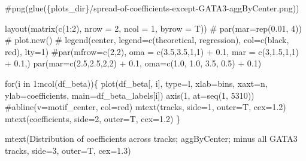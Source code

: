 \documentclass[
  letterpaper,
  DIV=11,
  numbers=noendperiod]{scrartcl}
\newenvironment{Shaded}{\begin{snugshade}}{\end{snugshade}}
\newcommand{\AttributeTok}[1]{\textcolor[rgb]{0.40,0.45,0.13}{#1}}
\newcommand{\CommentTok}[1]{\textcolor[rgb]{0.37,0.37,0.37}{#1}}
\newcommand{\ControlFlowTok}[1]{\textcolor[rgb]{0.00,0.23,0.31}{#1}}
\newcommand{\DecValTok}[1]{\textcolor[rgb]{0.68,0.00,0.00}{#1}}
\newcommand{\FloatTok}[1]{\textcolor[rgb]{0.68,0.00,0.00}{#1}}
\newcommand{\FunctionTok}[1]{\textcolor[rgb]{0.28,0.35,0.67}{#1}}
\newcommand{\NormalTok}[1]{\textcolor[rgb]{0.00,0.23,0.31}{#1}}
\newcommand{\SpecialCharTok}[1]{\textcolor[rgb]{0.37,0.37,0.37}{#1}}
\newcommand{\StringTok}[1]{\textcolor[rgb]{0.13,0.47,0.30}{#1}}
\begin{document}
\begin{Shaded}
\begin{Highlighting}[]
\CommentTok{\#png(glue(\textquotesingle{}\{plots\_dir\}/spread{-}of{-}coefficients{-}except{-}GATA3{-}aggByCenter.png\textquotesingle{}))}

\FunctionTok{layout}\NormalTok{(}\FunctionTok{matrix}\NormalTok{(}\FunctionTok{c}\NormalTok{(}\DecValTok{1}\SpecialCharTok{:}\DecValTok{2}\NormalTok{), }\AttributeTok{nrow =} \DecValTok{2}\NormalTok{, }\AttributeTok{ncol =} \DecValTok{1}\NormalTok{, }\AttributeTok{byrow =}\NormalTok{ T))}
\CommentTok{\# par(mar=rep(0.01, 4))}
\CommentTok{\# plot.new()}
\CommentTok{\# legend(\textquotesingle{}center\textquotesingle{}, legend=c(\textquotesingle{}theoretical\textquotesingle{}, \textquotesingle{}regression\textquotesingle{}), col=c(\textquotesingle{}black\textquotesingle{}, \textquotesingle{}red\textquotesingle{}), lty=1)}
\CommentTok{\#par(mfrow=c(2,2), oma = c(3.5,3.5,1,1) + 0.1, mar = c(3,1.5,1,1) + 0.1,)}
\FunctionTok{par}\NormalTok{(}\AttributeTok{mar=}\FunctionTok{c}\NormalTok{(}\FloatTok{2.5}\NormalTok{,}\FloatTok{2.5}\NormalTok{,}\DecValTok{2}\NormalTok{,}\DecValTok{2}\NormalTok{) }\SpecialCharTok{+} \FloatTok{0.1}\NormalTok{, }\AttributeTok{oma=}\FunctionTok{c}\NormalTok{(}\FloatTok{1.0}\NormalTok{, }\FloatTok{1.0}\NormalTok{, }\FloatTok{3.5}\NormalTok{, }\FloatTok{0.5}\NormalTok{) }\SpecialCharTok{+} \FloatTok{0.1}\NormalTok{)}

\ControlFlowTok{for}\NormalTok{(i }\ControlFlowTok{in} \DecValTok{1}\SpecialCharTok{:}\FunctionTok{ncol}\NormalTok{(df\_beta))\{}
    \FunctionTok{plot}\NormalTok{(df\_beta[, i], }\AttributeTok{type=}\StringTok{\textquotesingle{}l\textquotesingle{}}\NormalTok{, }\AttributeTok{xlab=}\StringTok{\textquotesingle{}bins\textquotesingle{}}\NormalTok{, }\AttributeTok{xaxt=}\StringTok{\textquotesingle{}n\textquotesingle{}}\NormalTok{, }\AttributeTok{ylab=}\StringTok{\textquotesingle{}coefficients\textquotesingle{}}\NormalTok{, }\AttributeTok{main=}\NormalTok{df\_beta\_labels[i])}
    \FunctionTok{axis}\NormalTok{(}\DecValTok{1}\NormalTok{, }\AttributeTok{at=}\FunctionTok{seq}\NormalTok{(}\DecValTok{1}\NormalTok{, }\DecValTok{5310}\NormalTok{))}
    \CommentTok{\#abline(v=motif\_center, col=\textquotesingle{}red\textquotesingle{})}
    \FunctionTok{mtext}\NormalTok{(}\StringTok{\textquotesingle{}tracks\textquotesingle{}}\NormalTok{, }\AttributeTok{side=}\DecValTok{1}\NormalTok{, }\AttributeTok{outer=}\NormalTok{T, }\AttributeTok{cex=}\FloatTok{1.2}\NormalTok{)}
    \FunctionTok{mtext}\NormalTok{(}\StringTok{\textquotesingle{}coefficients\textquotesingle{}}\NormalTok{, }\AttributeTok{side=}\DecValTok{2}\NormalTok{, }\AttributeTok{outer=}\NormalTok{T, }\AttributeTok{cex=}\FloatTok{1.2}\NormalTok{)}
\NormalTok{\}}

\FunctionTok{mtext}\NormalTok{(}\StringTok{\textquotesingle{}Distribution of coefficients across tracks; aggByCenter; minus all GATA3 tracks\textquotesingle{}}\NormalTok{, }\AttributeTok{side=}\DecValTok{3}\NormalTok{, }\AttributeTok{outer=}\NormalTok{T, }\AttributeTok{cex=}\FloatTok{1.3}\NormalTok{)}
\end{Highlighting}
\end{Shaded}
\end{document}
